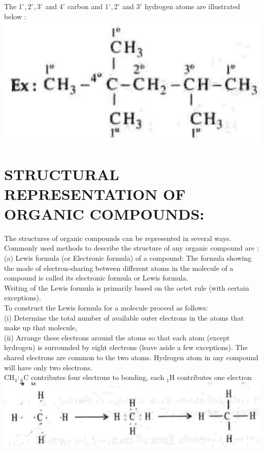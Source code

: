 \documentclass[10pt]{article}
\begin{document}
The $1^{\circ}, 2^{\circ}, 3^{\circ}$ and $4^{\circ}$ carbon and $1^{\circ}, 2^{\circ}$ and $3^{\circ}$ hydrogen atoms are illustrated below :\\
\includegraphics[max width=\textwidth, center]{2025_01_28_8470952b98110cec3aabg-005}

\section*{STRUCTURAL REPRESENTATION OF ORGANIC COMPOUNDS:}
The structures of organic compounds can be represented in several ways. Commonly used methods to describe the structure of any organic compound are :\\
(a) Lewis formula (or Electronic formula) of a compound: The formula showing the mode of electron-sharing between different atoms in the molecule of a compound is called its electronic formula or Lewis formula.\\
Writing of the Lewis formula is primarily based on the octet rule (with certain exceptions).\\
To construct the Lewis formula for a molecule proceed as follows:\\
(i) Determine the total number of available outer electrons in the atoms that make up that molecule,\\
(ii) Arrange these electrons around the atoms so that each atom (except hydrogen) is surrounded by eight electrons (leave aside a few exceptions). The shared electrons are common to the two atoms. Hydrogen atom in any compound will have only two electrons.\\
$\mathrm{CH}_{4}:{ }_{6} \mathrm{C}$ contributes four electrons to bonding, each ${ }_{1} \mathrm{H}$ contributes one electron\\
\includegraphics[max width=\textwidth, center]{2025_01_28_8470952b98110cec3aabg-006(1)}
\end{document}
